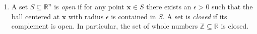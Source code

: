 \begin{enumerate}
    \item A set $S \subseteq \mathbb{R}^n$ is \textit{open} if for any point $\mathbf x \in S$ there exists an $\epsilon > 0$ such that the ball centered at $\mathbf x$ with radius $\epsilon$ is contained in $S$. A set is \textit{closed} if its complement is open. 
    In particular, the set of whole numbers $\mathbb{Z} \subseteq \mathbb{R}$ is closed.
\end{enumerate}
\thispagestyle{plain}
